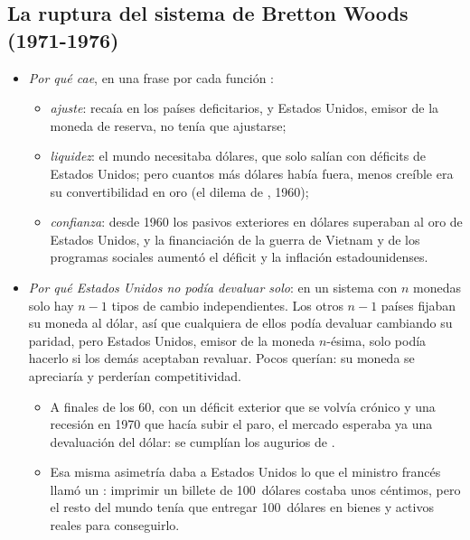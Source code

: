 \documentclass[11pt]{article}
\begin{document}
\subsection{La ruptura del sistema de Bretton Woods (1971-1976)}\label{sec:ruptura}

\begin{itemize}
\item \emph{Por qué cae}, en una frase por cada función :
  \begin{itemize}
  \item \emph{ajuste}: recaía en los países deficitarios, y Estados Unidos, emisor de la moneda de reserva, no tenía que ajustarse;
  \item \emph{liquidez}: el mundo necesitaba dólares, que solo salían con déficits de Estados Unidos; pero cuantos más dólares había fuera, menos creíble era su convertibilidad en oro (el dilema de , 1960);
  \item \emph{confianza}: desde 1960 los pasivos exteriores en dólares superaban al oro de Estados Unidos, y la financiación de la guerra de Vietnam y de los programas sociales aumentó el déficit y la inflación estadounidenses.
  \end{itemize}
\item \emph{Por qué Estados Unidos no podía devaluar solo}: en un sistema con $n$ monedas solo hay $n-1$ tipos de cambio independientes. Los otros $n-1$ países fijaban su moneda al dólar, así que cualquiera de ellos podía devaluar cambiando su paridad, pero Estados Unidos, emisor de la moneda $n$-ésima, solo podía hacerlo si los demás aceptaban revaluar. Pocos querían: su moneda se apreciaría y perderían competitividad.
  \begin{itemize}
  \item A finales de los 60, con un déficit exterior que se volvía crónico y una recesión en 1970 que hacía subir el paro, el mercado esperaba ya una devaluación del dólar: se cumplían los augurios de .
  \item Esa misma asimetría daba a Estados Unidos lo que el ministro francés  llamó un : imprimir un billete de 100~dólares costaba unos céntimos, pero el resto del mundo tenía que entregar 100~dólares en bienes y activos reales para conseguirlo\nocite{Eichengreen2011Exorbitant}.
  \end{itemize}

\end{itemize}
\end{document}
